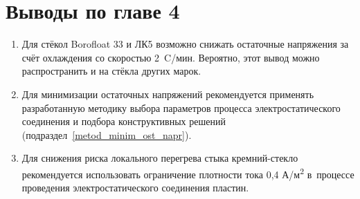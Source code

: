 \section{Выводы по главе 4}
\begin{enumerate}
    \item Для стёкол Borofloat 33 и ЛК5 возможно снижать остаточные
    напряжения за счёт охлаждения со скоростью 2~{\textdegree}C/мин.
    Вероятно, этот вывод можно распространить и на стёкла других
    марок.
    \item Для минимизации остаточных напряжений рекомендуется
    применять разработанную методику выбора параметров процесса
    электростатического соединения и подбора конструктивных решений
    (подраздел~\ref{metod_minim_ost_napr}).
    \item Для снижения риска локального перегрева стыка
    кремний\nb-стекло рекомендуется использовать ограничение плотности
    тока 0,4 А/м{\textsuperscript{2}} в~процессе проведения
    электростатического соединения пластин.
\end{enumerate}
